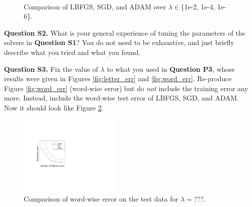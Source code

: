 \documentclass[11pt]{report}
\begin{document}
\begin{figure}[t]
\centering
{}
~~
~~
\caption{Comparison of LBFGS, SGD, and ADAM over $\lambda \in \{${\sf 1e-2, 1e-4, 1e-6}\}.}
\label{fig:compare_sgd}
\end{figure}


{\bf Question S2.}
What is your general experience of tuning the parameters of the solvers in {\bf Question S1}?
You do not need to be exhaustive, and just briefly describe what you tried and what you found.

{\bf Question S3.}
Fix the value of $\lambda$ to what you used in {\bf Question P3},
whose results were given in Figures \ref{fig:letter_err} and \ref{fig:word_err}.
Re-produce Figure \ref{fig:word_err} (word-wise error) but do \emph{not} include the training error any more.
Instead, include the word-wise test error of LBFGS, SGD, and ADAM.
Now it should look like Figure \ref{fig:compare_word_err}.

\begin{figure}[t]
\centering
\includegraphics[width=5cm]{error_sgd}
\caption{Comparison of word-wise error on the test data for $\lambda=$???.}
\label{fig:compare_word_err}
\end{figure}
\end{document}
